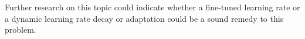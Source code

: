 Further research on this topic could indicate whether a fine-tuned learning rate or a dynamic learning rate decay or adaptation could be a sound remedy to this problem. 

%
%	
%
%	
%	
%	
%	

